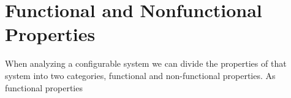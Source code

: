 \section{Functional and Nonfunctional Properties}\label{ch:properties}

When analyzing a configurable system we can divide the properties of that system into two categories, functional and non-functional properties.
As functional properties 
